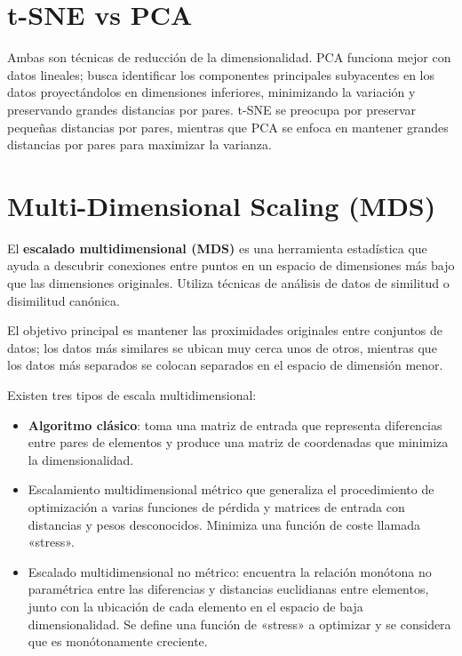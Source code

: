 \section{t-SNE vs PCA}

Ambas son técnicas de reducción de la dimensionalidad. PCA funciona mejor con datos lineales; busca identificar los componentes principales subyacentes en los datos proyectándolos en dimensiones inferiores, minimizando la variación y preservando grandes distancias por pares. t-SNE se preocupa por preservar pequeñas distancias por pares, mientras que PCA se enfoca en mantener grandes distancias por pares para maximizar la varianza.

\section{Multi-Dimensional Scaling (MDS)}
El \textbf{escalado multidimensional (MDS)} es una herramienta estadística que ayuda a descubrir conexiones entre puntos en un espacio de dimensiones más bajo que las dimensiones originales. Utiliza técnicas de análisis de datos de similitud o disimilitud canónica.

El objetivo principal es mantener las proximidades originales entre conjuntos de datos; los datos más similares se ubican muy cerca unos de otros, mientras que los datos más separados se colocan separados en el espacio de dimensión menor.

Existen tres tipos de escala multidimensional: 
\begin{itemize}
    \item  \textbf{Algoritmo clásico}: toma una matriz de entrada que representa diferencias entre pares de elementos y produce una matriz de coordenadas que minimiza la dimensionalidad.

    \item Escalamiento multidimensional métrico que generaliza el procedimiento de optimización a varias funciones de pérdida y matrices de entrada con distancias y pesos desconocidos. Minimiza una función de coste llamada «stress».

    \item  Escalado multidimensional no métrico: encuentra la relación monótona no paramétrica entre las diferencias y distancias euclidianas entre elementos, junto con la ubicación de cada elemento en el espacio de baja dimensionalidad. Se define una función de «stress» a optimizar y se considera que es monótonamente creciente.
\end{itemize}


